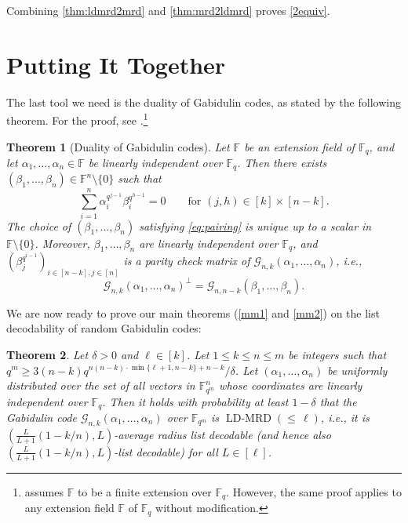 \documentclass[11pt]{article}
\theoremstyle{plain}
\newtheorem{thm}{Theorem}[section]
\theoremstyle{definition}
\theoremstyle{remark}
\newcommand{\ldmrd}[1]{\operatorname{LD-MRD}({\leq}\,#1)}
\newcommand{\F}{\mathbb{F}}
\def \mG {\mathcal{G}}
\begin{document}
Combining \cref{thm:ldmrd2mrd} and \cref{thm:mrd2ldmrd} proves \cref{2equiv}.

\section{Putting It Together}
The last tool we need is the duality of Gabidulin codes, as stated by the following theorem. For the proof, see \cite[Lemma~2.7.2]{bartz2022rank}.\footnote{\cite[Lemma~2.7.2]{bartz2022rank} assumes $\F$ to be a finite extension over $\F_q$. However, the same proof applies to any extension field $\F$ of $\F_q$ without modification. }

\begin{thm}[Duality of Gabidulin codes]\label{duali}
Let $\F$ be an extension field of $\F_q$, and let $\alpha_1,\dots,\alpha_n\in \F$ be linearly independent over $\F_q$.
Then there exists $(\beta_1,\dots,\beta_n)\in \F^n\setminus\{0\}$ such that
\begin{equation}\label{eq:pairing}
\sum_{i=1}^n \alpha_i^{q^{j-1}}\beta_i^{q^{h-1}}=0 \qquad \text{for $(j,h)\in [k]\times [n-k]$}.
\end{equation}
The choice of $(\beta_1,\dots,\beta_n)$ satisfying \eqref{eq:pairing} is unique up to a scalar in $\F\setminus\{0\}$.
Moreover, $\beta_1,\dots,\beta_n$ are linearly independent over $\F_q$, and $\left(\beta_j^{q^{i-1}}\right)_{i\in [n-k], j\in [n]}$ is a parity check matrix of $\mG_{n,k}(\alpha_1,\dotsc, \alpha_n)$, i.e., 
\[
\mG_{n,k}(\alpha_1,\dotsc, \alpha_n)^\perp=\mG_{n,n-k}(\beta_1,\dotsc, \beta_n).
\]
\end{thm}

We are now ready to prove our main theorems (\cref{mm1} and \cref{mm2}) on the list decodability of random Gabidulin codes:

\begin{thm}\label{thm:list-decodability}
Let $\delta>0$ and $\ell\in [k]$.
Let $1\leq k\leq n\leq m$ be integers such that $q^m\geq 3(n-k)q^{n(n-k)\cdot\min\{\ell+1,n-k\}+n-k}/\delta$.
 Let $(\alpha_1,\dots,\alpha_n)$ be uniformly distributed over the set of all vectors in $\F_{q^m}^n$ whose coordinates are linearly independent over $\F_q$. Then it holds with probability at least $1-\delta$ that the Gabidulin code $\mG_{n,k}(\alpha_1,\dots, \alpha_n)$ over $\F_{q^m}$ is $\ldmrd{\ell}$, i.e., it is $\left(\frac{L}{L+1}\left(1-{k}/{n}\right), L\right)$-average radius list decodable (and hence also $\left(\frac{L}{L+1}\left(1-{k}/{n}\right), L\right)$-list decodable) for all $L\in [\ell]$.
\end{thm}
\end{document}
